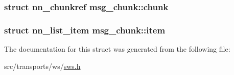 \subsubsection[{chunk}]{\setlength{\rightskip}{0pt plus 5cm}struct {\bf nn\+\_\+chunkref} msg\+\_\+chunk\+::chunk}\hypertarget{structmsg__chunk_a001988b0b2d95416966e7f2fe1655f78}{}\label{structmsg__chunk_a001988b0b2d95416966e7f2fe1655f78}
\subsubsection[{item}]{\setlength{\rightskip}{0pt plus 5cm}struct {\bf nn\+\_\+list\+\_\+item} msg\+\_\+chunk\+::item}\hypertarget{structmsg__chunk_a6213f0c7d69f12c92c6b93128940ec3d}{}\label{structmsg__chunk_a6213f0c7d69f12c92c6b93128940ec3d}


The documentation for this struct was generated from the following file\+:\begin{DoxyCompactItemize}
\item 
src/transports/ws/\hyperlink{sws_8h}{sws.\+h}\end{DoxyCompactItemize}
